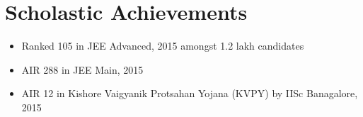 \section*{\sc Scholastic Achievements}
\vspace{-2mm}
\hrulefill
\vspace{.2cm}

\begin{itemize}
\item Ranked 105 in JEE Advanced, 2015 amongst 1.2 lakh candidates
\item AIR 288 in JEE Main, 2015
\item AIR 12 in Kishore Vaigyanik Protsahan Yojana (KVPY) by IISc Banagalore, 2015
\end{itemize}